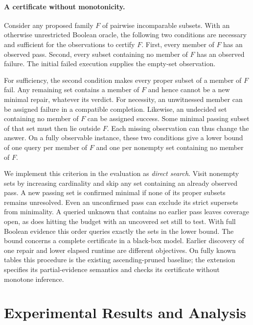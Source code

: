\documentclass[11pt,letterpaper]{article}
\begin{document}
\paragraph{A certificate without monotonicity.}
Consider any proposed family $F$ of pairwise incomparable subsets. With an otherwise unrestricted Boolean oracle, the following two conditions are necessary and sufficient for the observations to certify $F$. First, every member of $F$ has an observed pass. Second, every subset containing no member of $F$ has an observed failure. The initial failed execution supplies the empty-set observation.

For sufficiency, the second condition makes every proper subset of a member of $F$ fail. Any remaining set contains a member of $F$ and hence cannot be a new minimal repair, whatever its verdict. For necessity, an unwitnessed member can be assigned failure in a compatible completion. Likewise, an undecided set containing no member of $F$ can be assigned success. Some minimal passing subset of that set must then lie outside $F$. Each missing observation can thus change the answer. On a fully observable instance, these two conditions give a lower bound of one query per member of $F$ and one per nonempty set containing no member of $F$.

We implement this criterion in the evaluation as \emph{direct search}. Visit nonempty sets by increasing cardinality and skip any set containing an already observed pass. A new passing set is confirmed minimal if none of its proper subsets remains unresolved. Even an unconfirmed pass can exclude its strict supersets from minimality. A queried unknown that contains no earlier pass leaves coverage open, as does hitting the budget with an uncovered set still to test. With full Boolean evidence this order queries exactly the sets in the lower bound. The bound concerns a complete certificate in a black-box model. Earlier discovery of one repair and lower elapsed runtime are different objectives. On fully known tables this procedure is the existing ascending-pruned baseline; the extension specifies its partial-evidence semantics and checks its certificate without monotone inference.

\section{Experimental Results and Analysis}
\end{document}
